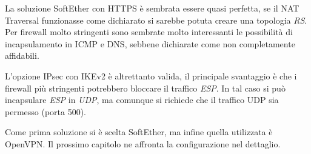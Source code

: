 La soluzione SoftEther con HTTPS è sembrata essere quasi perfetta, se il NAT Traversal
funzionasse come dichiarato si sarebbe potuta creare una topologia \textit{RS}.
Per firewall molto stringenti sono sembrate molto interessanti le possibilità di incapsulamento
in ICMP  e DNS, sebbene dichiarate come non completamente affidabili.

L'opzione IPsec con IKEv2 è altrettanto valida, il principale svantaggio è che i firewall più stringenti
potrebbero bloccare il traffico \textit{ESP}. In tal caso si può incapsulare \textit{ESP} in \textit{UDP},
ma comunque si richiede che il traffico UDP sia permesso (porta 500).

Come prima soluzione si è scelta SoftEther, ma infine quella utilizzata è OpenVPN. Il
prossimo capitolo ne affronta la configurazione nel dettaglio.
